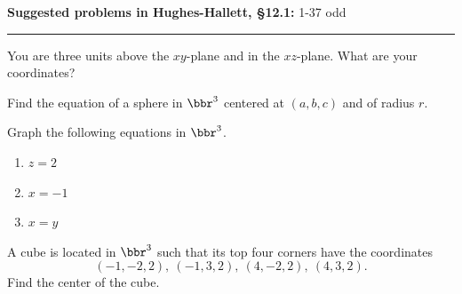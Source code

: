 \documentclass[12pt,reqno]{amsart}
\begin{document}
\textbf{Suggested problems in Hughes-Hallett, \S12.1:} 1-37 odd

\bigskip
\hrule

\bigskip

\prob You are three units above the $xy$-plane and in the $xz$-plane. What are your coordinates?
\vspace{0.75in}

\prob Find the equation of a sphere in $\bbr^3$ centered at $(a,b,c)$ and of radius $r$.
\vspace{0.75in}

\prob Graph the following equations in $\bbr^3$.

\medskip
\begin{enumerate}
\item $z=2$\vfill
\item $x=-1$\vfill
\item $x=y$\vfill
\end{enumerate}

\newpage
\prob A cube is located in $\bbr^3$ such that its top four corners have the coordinates
	\[(-1,-2,2), \ (-1,3,2), \ (4,-2,2), \ (4,3,2).
	\]
Find the center of the cube.
\end{document}
